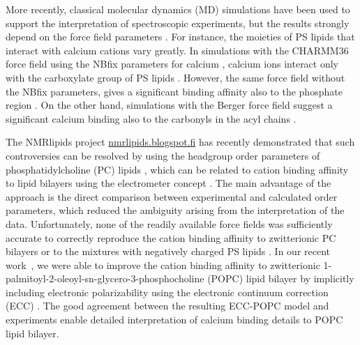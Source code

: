 \documentclass[journal=jpcbfk,manuscript=article]{achemso}
\begin{document}
More recently, classical molecular dynamics (MD) simulations
have been used to support the interpretation of spectroscopic experiments,
but the results strongly depend on the force field parameters \cite{boettcher11,kucerka14,melcrova16,hallock18,valentine18}.
For instance, the moieties of PS lipids that interact with calcium cations vary greatly.
In simulations with the CHARMM36 force field \cite{klauda10,venable13} using the NBfix parameters for calcium \cite{kim16}, 
calcium ions interact only with the carboxylate group of PS lipids \cite{valentine18}.
However, the same force field without the NBfix parameters, gives a significant binding affinity also to the phosphate region \cite{hallock18}.
On the other hand, simulations with the Berger force field \cite{berger97,mukhopadhyay04}
suggest a significant calcium binding also to the carbonyls in the acyl chains \cite{melcrova16}.

The NMRlipids project \url{nmrlipids.blogspot.fi} has recently demonstrated
that such controversies can be resolved by using the headgroup order parameters
of phosphatidylcholine (PC) lipids \cite{catte16, NMRlipidsIV}, which can
be related to cation binding affinity to lipid bilayers using the electrometer
concept \cite{akutsu81,altenbach84,seelig87}. The main advantage of the approach
is the direct comparison between experimental and calculated order parameters,
which reduced the ambiguity arising from the interpretation of the data.
Unfortunately, none of the readily available force fields was sufficiently accurate to correctly reproduce the
cation binding affinity to zwitterionic PC bilayers \cite{catte16} or to the
mixtures with negatively charged PS lipids \cite{NMRlipidsIV}.
In our recent work~\cite{melcr18}, we were able to improve the cation binding affinity
to zwitterionic 1-palmitoyl-2-oleoyl-sn-glycero-3-phosphocholine (POPC) lipid bilayer
by implicitly including electronic polarizability using the electronic continuum
correction (ECC) \cite{leontyev09}. The good agreement between the resulting ECC-POPC
model and experiments enable detailed interpretation of calcium binding details to POPC lipid bilayer.

\end{document}
